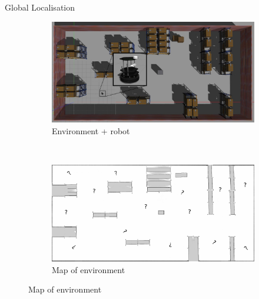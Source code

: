 \begin{frame}[noframenumbering]{Global Localisation}

\begin{figure}[t!]
    \centering
    \begin{subfigure}[t]{0.5\textwidth}
        \centering
        \includegraphics[scale=0.11]{./figures/02/world.jpg}
        \caption{Environment + robot}
    \end{subfigure}%
    ~
    \begin{subfigure}[t]{0.5\textwidth}
        \centering
        \includegraphics[scale=0.11]{./figures/02/map.png}
        \caption{Map of environment}
    \end{subfigure}
\end{figure}



\end{frame}
